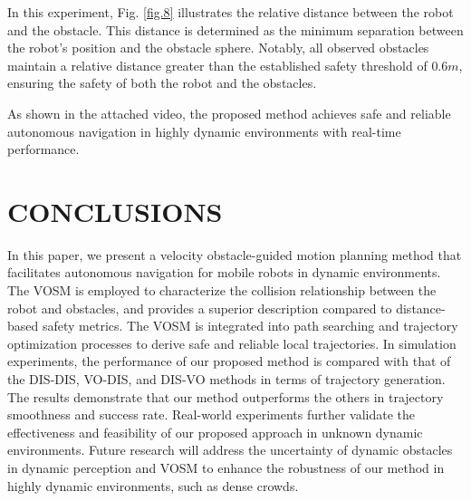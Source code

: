 \documentclass[preprint,5p,times,twocolumn,authoryear]{elsarticle}
\begin{document}
In this experiment, Fig. \ref{fig.8} illustrates the relative distance between the robot and the obstacle. This distance is determined as the minimum separation between the robot's position and the obstacle sphere. Notably, all observed obstacles maintain a relative distance greater than the established safety threshold of $0.6m$, ensuring the safety of both the robot and the obstacles.

As shown in the attached video, the proposed method achieves safe and reliable autonomous navigation in highly dynamic environments with real-time performance.


\section{CONCLUSIONS}
\label{CONCLUSIONS}

In this paper, we present a velocity obstacle-guided motion planning method that facilitates autonomous navigation for mobile robots in dynamic environments. The VOSM is employed to characterize the collision relationship between the robot and obstacles, and provides a superior description compared to distance-based safety metrics. The VOSM is integrated into path searching and trajectory optimization processes to derive safe and reliable local trajectories. In simulation experiments, the performance of our proposed method is compared with that of the DIS-DIS, VO-DIS, and DIS-VO methods in terms of trajectory generation. The results demonstrate that our method outperforms the others in trajectory smoothness and success rate. Real-world experiments further validate the effectiveness and feasibility of our proposed approach in unknown dynamic environments. Future research will address the uncertainty of dynamic obstacles in dynamic perception and VOSM to enhance the robustness of our method in highly dynamic environments, such as dense crowds.


% 
% 



\end{document}
